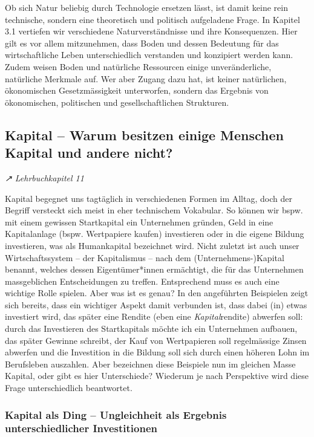 \documentclass[
  nswissgerman,
  a4paper,
  DIV=11,
  numbers=noendperiod,
  oneside,
  openany]{scrreprt}
\begin{document}
Ob sich Natur beliebig durch Technologie ersetzen lässt, ist damit keine
rein technische, sondern eine theoretisch und politisch aufgeladene
Frage. In Kapitel 3.1 vertiefen wir verschiedene Naturverständnisse und
ihre Konsequenzen. Hier gilt es vor allem mitzunehmen, dass Boden und
dessen Bedeutung für das wirtschaftliche Leben unterschiedlich
verstanden und konzipiert werden kann. Zudem weisen Boden und natürliche
Ressourcen einige unveränderliche, natürliche Merkmale auf. Wer aber
Zugang dazu hat, ist keiner natürlichen, ökonomischen Gesetzmässigkeit
unterworfen, sondern das Ergebnis von ökonomischen, politischen und
gesellschaftlichen Strukturen.

\subsection{Kapital -- Warum besitzen einige Menschen Kapital und andere
nicht?}\label{kapital-warum-besitzen-einige-menschen-kapital-und-andere-nicht}

\emph{↗ Lehrbuchkapitel 11}

Kapital begegnet uns tagtäglich in verschiedenen Formen im Alltag, doch
der Begriff versteckt sich meist in eher technischem Vokabular. So
können wir bspw. mit einem gewissen Startkapital ein Unternehmen
gründen, Geld in eine Kapitalanlage (bspw. Wertpapiere kaufen)
investieren oder in die eigene Bildung investieren, was als Humankapital
bezeichnet wird. Nicht zuletzt ist auch unser Wirtschaftssystem -- der
Kapitalismus -- nach dem (Unternehmens-)Kapital benannt, welches dessen
Eigentümer*innen ermächtigt, die für das Unternehmen massgeblichen
Entscheidungen zu treffen. Entsprechend muss es auch eine wichtige Rolle
spielen. Aber was ist es genau? In den angeführten Beispielen zeigt sich
bereits, dass ein wichtiger Aspekt damit verbunden ist, dass dabei (in)
etwas investiert wird, das später eine Rendite (eben eine
\emph{Kapital}rendite) abwerfen soll: durch das Investieren des
Startkapitals möchte ich ein Unternehmen aufbauen, das später Gewinne
schreibt, der Kauf von Wertpapieren soll regelmässige Zinsen abwerfen
und die Investition in die Bildung soll sich durch einen höheren Lohn im
Berufsleben auszahlen. Aber bezeichnen diese Beispiele nun im gleichen
Masse Kapital, oder gibt es hier Unterschiede? Wiederum je nach
Perspektive wird diese Frage unterschiedlich beantwortet.

\subsubsection{Kapital als Ding -- Ungleichheit als Ergebnis
unterschiedlicher
Investitionen}\label{kapital-als-ding-ungleichheit-als-ergebnis-unterschiedlicher-investitionen}
\end{document}
